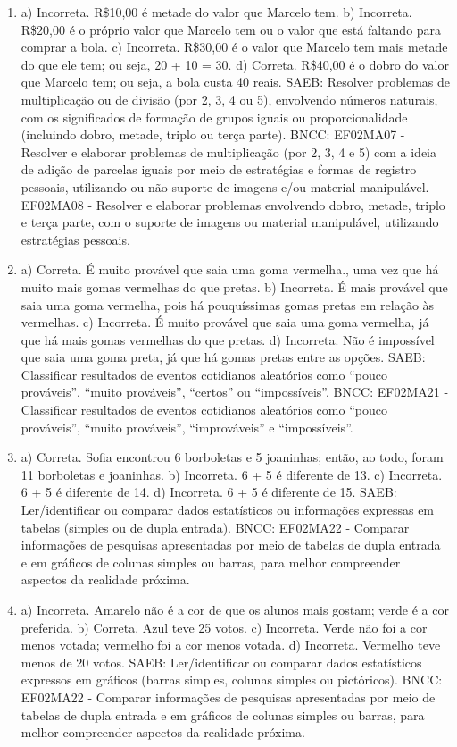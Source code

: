 \begin{enumerate}
\item
a) Incorreta. R\$10,00 é metade do valor que Marcelo tem.
b) Incorreta. R\$20,00 é o próprio valor que Marcelo tem ou o valor que
está faltando para comprar a bola.
c) Incorreta. R\$30,00 é o valor que Marcelo tem mais metade do que ele
tem; ou seja, 20 + 10 = 30.
d) Correta. R\$40,00 é o dobro do valor que Marcelo tem; ou seja, a bola
custa 40 reais.
SAEB: Resolver problemas de multiplicação ou de divisão (por 2,
3, 4 ou 5), envolvendo números naturais, com os significados de formação
de grupos iguais ou proporcionalidade (incluindo dobro, metade, triplo
ou terça parte).
BNCC: EF02MA07 - Resolver e elaborar problemas de multiplicação (por 2,
3, 4 e 5) com a ideia de adição de parcelas iguais por meio de
estratégias e formas de registro pessoais, utilizando ou não suporte de
imagens e/ou material manipulável. EF02MA08 - Resolver e elaborar
problemas envolvendo dobro, metade, triplo e terça parte, com o suporte
de imagens ou material manipulável, utilizando estratégias pessoais.


\item
a) Correta. É muito provável que saia uma goma vermelha., uma vez que há
muito mais gomas vermelhas do que pretas.
b) Incorreta. É mais provável que saia uma goma vermelha, pois há
pouquíssimas gomas pretas em relação às vermelhas.
c) Incorreta. É muito provável que saia uma goma vermelha, já que há
mais gomas vermelhas do que pretas.
d) Incorreta. Não é impossível que saia uma goma preta, já que há gomas
pretas entre as opções.
SAEB: Classificar resultados de eventos cotidianos aleatórios
como ``pouco prováveis'', ``muito prováveis'', ``certos'' ou
``impossíveis''.
BNCC: EF02MA21 - Classificar resultados de eventos cotidianos aleatórios
como ``pouco prováveis'', ``muito prováveis'', ``improváveis'' e
``impossíveis''.

\item
a) Correta. Sofia encontrou 6 borboletas e 5 joaninhas; então, ao todo, foram 11 borboletas e joaninhas.
b) Incorreta. 6 + 5 é diferente de 13.
c) Incorreta. 6 + 5 é diferente de 14.
d) Incorreta. 6 + 5 é diferente de 15.
SAEB: Ler/identificar ou comparar dados estatísticos ou
informações expressas em tabelas (simples ou de dupla entrada).
BNCC: EF02MA22 - Comparar informações de pesquisas apresentadas por meio
de tabelas de dupla entrada e em gráficos de colunas simples ou barras,
para melhor compreender aspectos da realidade próxima.

\item
a) Incorreta. Amarelo não é a cor de que os alunos mais gostam; verde é a cor preferida.
b) Correta. Azul teve 25 votos.
c) Incorreta. Verde não foi a cor menos votada; vermelho foi a cor menos votada.
d) Incorreta. Vermelho teve menos de 20 votos.
SAEB: Ler/identificar ou comparar dados estatísticos expressos
em gráficos (barras simples, colunas simples ou pictóricos).
BNCC: EF02MA22 - Comparar informações de pesquisas apresentadas por meio
de tabelas de dupla entrada e em gráficos de colunas simples ou barras,
para melhor compreender aspectos da realidade próxima.

\end{enumerate}

